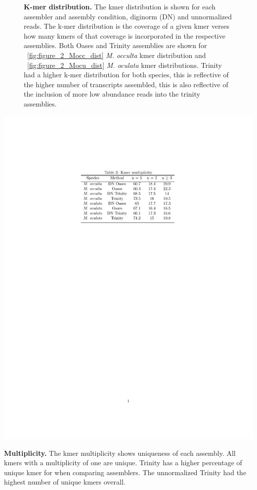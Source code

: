 \documentclass[fleqn,10pt]{wlpeerj}
\begin{document}
\begin{figure}[tbp]
	\begin{center}
	\end{center}
	\caption{\textbf{K-mer distribution.} The kmer distribution is shown for each assembler and assembly condition, diginorm (DN) and unnormalized reads. The k-mer distribution is the coverage of a given kmer verses how many kmers of that coverage is incorporated in the respective assemblies. Both Oases and Trinity assemblies are shown for ~\ref{fig:figure_2_Mocc_dist} \textit{M. occulta} kmer distribution and  ~\ref{fig:figure_2_Mocu_dist} \textit{M. oculata} kmer distributions. Trinity had a higher k-mer distribution for both species, this is reflective of the higher number of transcripts assembled, this is also reflective of the inclusion of more low abundance reads into the trinity assemblies.}
	\label{fig:kmer_spec}
\end{figure}

\begin{table}[tbp]
\centering
\includegraphics[width=0.4\linewidth]{Table_3_multiplicity.pdf}
\caption{\textbf{Multiplicity.} The kmer multiplicity shows uniqueness of each assembly. All kmers with a multiplicity of one are unique. Trinity has a higher percentage of unique kmer for when comparing assemblers. The unnormalized Trinity had the highest number of unique kmers overall.}
\label{fig:multiplicity}
\end{table}
\end{document}
